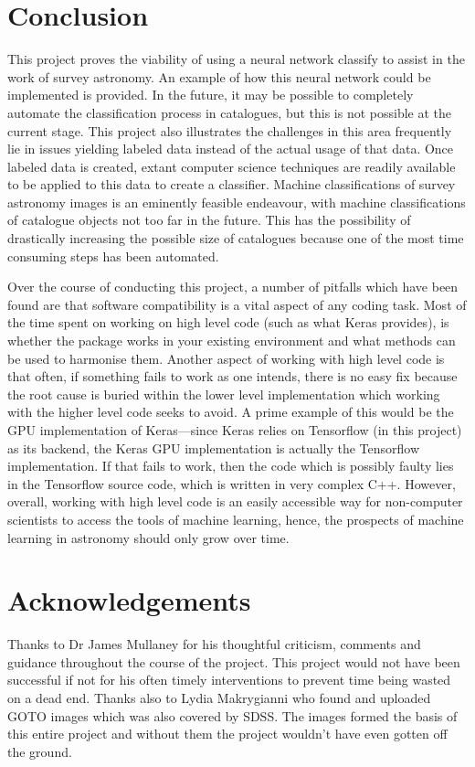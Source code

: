 \documentclass[a4paper,fleqn,usenatbib]{mnras}
\begin{document}
\section{Conclusion}
This project proves the viability of using a neural network classify to assist in the work of survey astronomy. An example of how this neural network could be implemented is provided. In the future, it may be possible to completely automate the classification process in catalogues, but this is not possible at the current stage. This project also illustrates the challenges in this area frequently lie in issues yielding labeled data instead of the actual usage of that data. Once labeled data is created, extant computer science techniques are readily available to be applied to this data to create a classifier. Machine classifications of survey astronomy images is an eminently feasible endeavour, with machine classifications of catalogue objects not too far in the future. This has the possibility of drastically increasing the possible size of catalogues because one of the most time consuming steps has been automated.

Over the course of conducting this project, a number of pitfalls which have been found are that software compatibility is a vital aspect of any coding task. Most of the time spent on working on high level code (such as what Keras provides), is whether the package works in your existing environment and what methods can be used to harmonise them. Another aspect of working with high level code is that often, if something fails to work as one intends, there is no easy fix because the root cause is buried within the lower level implementation which working with the higher level code seeks to avoid. A prime example of this would be the GPU implementation of Keras---since Keras relies on Tensorflow (in this project) as its backend, the Keras GPU implementation is actually the Tensorflow implementation. If that fails to work, then the code which is possibly faulty lies in the Tensorflow source code, which is written in very complex C++. However, overall, working with high level code is an easily accessible way for non-computer scientists to access the tools of machine learning, hence, the prospects of machine learning in astronomy should only grow over time. 

\section*{Acknowledgements}
Thanks to Dr James Mullaney for his thoughtful criticism, comments and guidance throughout the course of the project. This project would not have been successful if not for his often timely interventions to prevent time being wasted on a dead end. Thanks also to Lydia Makrygianni who found and uploaded GOTO images which was also covered by SDSS. The images formed the basis of this entire project and without them the project wouldn't have even gotten off the ground.
\end{document}
